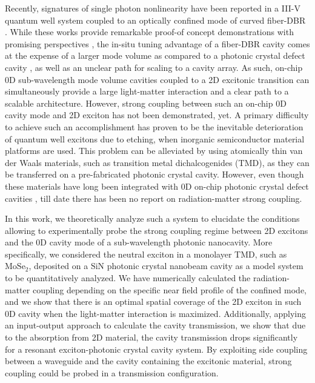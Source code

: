 \documentclass{achemso}
\begin{document}
Recently, signatures of single photon nonlinearity have been reported in a III-V quantum well system coupled to an optically confined mode of curved fiber-DBR \cite{delteil_towards_2019, munoz-matutano_emergence_2019}. While these works provide remarkable proof-of concept demonstrations with promising perspectives \cite{Gerace_NV_2019}, the in-situ tuning advantage of a fiber-DBR cavity comes at the expense of a larger mode volume as compared to a photonic crystal defect cavity \cite{greuter_small_2014, fryett_encapsulated_2018}, as well as an unclear path for scaling to a cavity array. As such, on-chip 0D sub-wavelength mode volume cavities coupled to a 2D excitonic transition can simultaneously provide a large light-matter interaction and a clear path to a scalable architecture. However, strong coupling between such an on-chip 0D cavity mode and 2D exciton has not been demonstrated, yet. A primary difficulty to achieve such an accomplishment has proven to be the inevitable deterioration of quantum well excitons due to etching, when inorganic semiconductor material platforms are used. This problem can be alleviated by using atomically thin van der Waals materials, such as transition metal dichalcogenides (TMD), as they can be transferred on a pre-fabricated photonic crystal cavity. However, even though these materials have long been integrated with 0D on-chip photonic crystal defect cavities \cite{Dirk_PhC_MoS2,Wu_2014}, till date there has been no report on radiation-matter strong coupling. 

In this work, we theoretically analyze such a system to elucidate the conditions allowing to experimentally probe the strong coupling regime between 2D excitons and the 0D cavity mode of a sub-wavelength photonic nanocavity. More specifically, we considered the neutral exciton in a monolayer TMD, such as $\mathrm{MoSe}_{2}$, deposited on a $\mathrm{SiN}$ photonic crystal nanobeam cavity as a model system to be quantitatively analyzed. We have numerically calculated the radiation-matter coupling depending on the specific near field profile of the confined mode, and we show that there is an optimal spatial coverage of the 2D exciton in such 0D cavity when the light-matter interaction is maximized. Additionally, applying an input-output approach to calculate the cavity transmission, we show that due to the absorption from 2D material, the cavity transmission drops significantly for a resonant exciton-photonic crystal cavity system. By exploiting side coupling between a waveguide and the cavity containing the excitonic material, strong coupling could be probed in a transmission configuration. 
\end{document}
